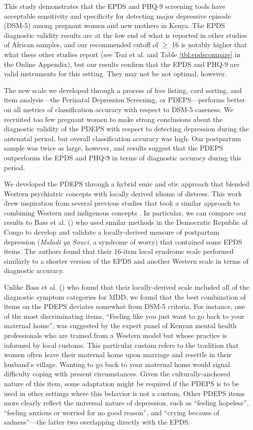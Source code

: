 \documentclass[man,natbib,longtable]{apa6}\usepackage[]{graphicx}\usepackage[]{color}
\begin{document}
This study demonstrates that the EPDS and PHQ-9 screening tools have acceptable sensitivity and specificity for detecting major depressive episode (DSM-5) among pregnant women and new mothers in Kenya. The EPDS diagnostic validity results are at the low end of what is reported in other studies of African samples, and our recommended cutoff of $\geq$ 16 is notably higher that what these other studies report (see Tsai et al. \citeyear{Tsai:2013} and Table \ref{tbl:epdscompare} in the Online Appendix), but our results confirm that the EPDS and PHQ-9 are valid instruments for this setting. They may not be not optimal, however.

The new scale we developed through a process of free listing, card sorting, and item analysis---the Perinatal Depression Screening, or PDEPS---performs better on all metrics of classification accuracy with respect to DSM-5 caseness. We recruited too few pregnant women to make strong conclusions about the diagnostic validity of the PDEPS with respect to detecting depression during the antenatal period, but overall classification accuracy was high. Our postpartum sample was twice as large, however, and results suggest that the PDEPS outperforms the EPDS and PHQ-9 in terms of diagnostic accuracy during this period.

We developed the PDEPS through a hybrid emic and etic approach that blended Western psychiatric concepts with locally derived idioms of distress. This work drew inspiration from several previous studies that took a similar approach to combining Western and indigenous concepts \citep[e.g.,][]{Bass:2008,Kaaya:2008,Nhiwatiwa:1998,Patel:1997}. In particular, we can compare our results to Bass et al. (\citeyear{Bass:2008}) who used similar methods in the Democratic Republic of Congo to develop and validate a locally-derived measure of postpartum depression (\textit{Maladi ya Souci}, a syndrome of worry) that contained some EPDS items. The authors found that their 16-item local syndrome scale performed similarly to a shorter version of the EPDS and another Western scale in terms of diagnostic accuracy.

Unlike Bass et al. (\citeyear{Bass:2008}) who found that their locally-derived scale included all of the diagnostic symptom categories for MDD, we found that the best combination of items on the PDEPS deviates somewhat from DSM-5 criteria. For instance, one of the most discriminating items, ``Feeling like you just want to go back to your maternal home'', was suggested by the expert panel of Kenyan mental health professionals who are trained from a Western model but whose practice is informed by local customs. This particular custom refers to the tradition that women often leave their maternal home upon marriage and resettle in their husband's village. Wanting to go back to your maternal home would signal difficulty coping with present circumstances. Given the culturally-anchored nature of this item, some adaptation might be required if the PDEPS is to be used in other settings where this behavior is not a custom. Other PDEPS items more clearly reflect the universal nature of depression, such as ``feeling hopeless'', ``feeling anxious or worried for no good reason'', and ``crying because of sadness''---the latter two overlapping directly with the EPDS.
\end{document}
